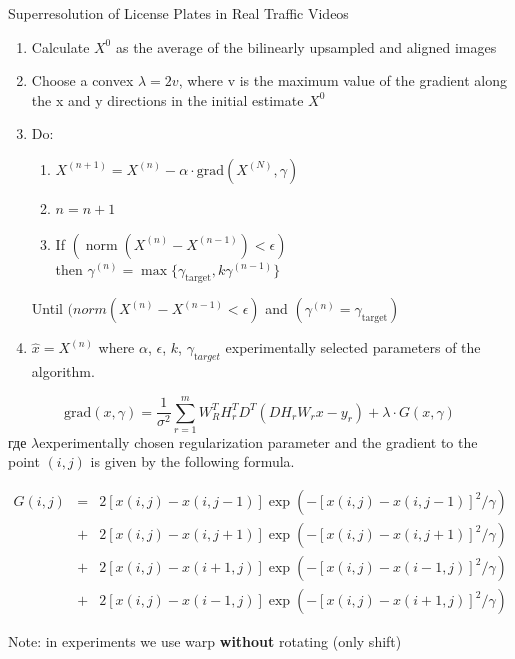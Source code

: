 \begin{frame}[allowframebreaks]{Superresolution of License Plates in Real Traffic Videos}
\begin{enumerate}
  \item Calculate $X^0$ as the average of the bilinearly upsampled and aligned images
  \item Choose a convex $\lambda = 2v$, where v is the maximum value of the gradient along the x and y directions in the
    initial estimate $X^0$
  \item Do:
    \begin{enumerate}
      \item $X^{(n+1)} = X^{(n)} - \alpha\cdot\mathrm{grad}(X^{(N)}, \gamma) $
      \item $n=n+1$
      \item If $(\operatorname{norm}(X^{(n)}-X^{(n-1)}) < \epsilon)$\\
        then $\gamma^{(n)} = \max \{\gamma_{\mathrm{target}}, k\gamma^{(n-1)}\}$
    \end{enumerate}
    Until $(norm(X^{(n)}-X^{(n-1)} < \epsilon)$ and $(\gamma^{(n)} = \gamma_{\mathrm{target}})$

  \item $ \hat{x} = X^{(n)}$
    where $\alpha$, $\epsilon$, $k$, $\gamma_{\mathrm target}$ experimentally selected parameters of the algorithm.
\end{enumerate}
$$
\mathrm{grad}(x, \gamma) = \frac{1}{\sigma^2} \sum^m_{r=1} W^T_R H^T_r D^T (D H_r W_r x-y_r) + \lambda \cdot G(x, \gamma)
$$
где $\lambda$experimentally chosen regularization parameter and the gradient to the point $ (i, j) $ is given by the
following formula.

$$
\begin{array}{rcl}
 G(i,j) & = & 2\left[x(i,j)-x(i,j-1)\right] \exp\left(-[ x(i,j)-x(i,j-1) ]^2/\gamma \right) \\
& + & 2\left[x(i,j)-x(i,j+1)\right] \exp\left(-[ x(i,j)-x(i,j+1) ]^2/\gamma \right) \\
& + & 2\left[x(i,j)-x(i+1,j)\right] \exp\left(-[ x(i,j)-x(i-1,j) ]^2/\gamma \right) \\
& + & 2\left[x(i,j)-x(i-1,j)\right] \exp\left(-[ x(i,j)-x(i+1,j) ]^2/\gamma \right)
\end{array}
$$

Note: in experiments we use warp \textbf{without} rotating (only shift)
\end{frame}


